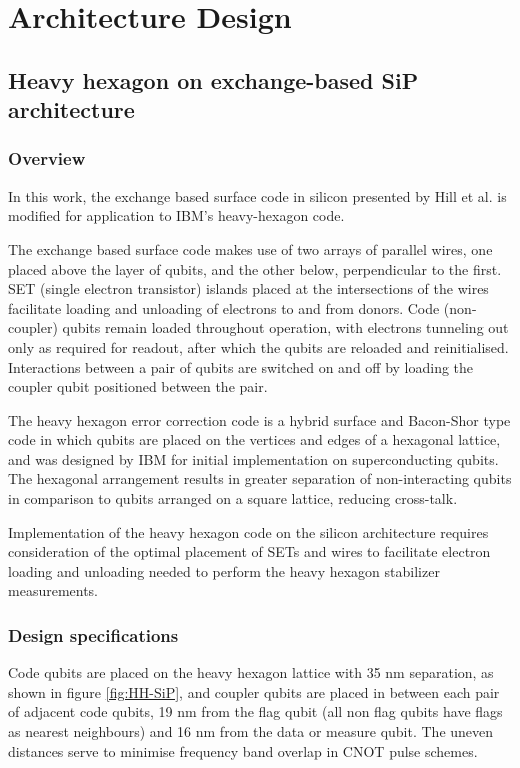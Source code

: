 \documentclass[../Thesis.tex]{subfiles}
\begin{document}
\chapter{Architecture Design}






\section{Heavy hexagon on exchange-based SiP architecture}
\subsection{Overview}
In this work, the exchange based surface code in silicon presented by Hill et al.\cite{surface-exchange}  is modified for application to IBM's heavy-hexagon code\cite{chamberland_topological_2020}. 

The exchange based surface code makes use of two arrays of parallel wires, one placed above the layer of qubits, and the other below, perpendicular to the first. SET (single electron transistor) islands placed at the intersections of the wires facilitate loading and unloading of electrons to and from donors. Code (non-coupler) qubits remain loaded throughout operation, with electrons tunneling out only as required for readout, after which the qubits are reloaded and reinitialised. Interactions between a pair of qubits are switched on and off by loading the coupler qubit positioned between the pair. 

The heavy hexagon error correction code is a hybrid surface and Bacon-Shor type code in which qubits are placed on the vertices and edges of a hexagonal lattice, and was designed by IBM for initial implementation on superconducting qubits. The hexagonal arrangement results in greater separation of non-interacting qubits in comparison to qubits arranged on a square lattice, reducing cross-talk. 

Implementation of the heavy hexagon code on the silicon architecture requires consideration of the optimal placement of SETs and wires to facilitate electron loading and unloading needed to perform the heavy hexagon stabilizer measurements.


\subsection{Design specifications}
Code qubits are placed on the heavy hexagon lattice with 35 nm separation, as shown in figure \ref{fig:HH-SiP}, and coupler qubits are placed in between each pair of adjacent code qubits, 19 nm from the flag qubit (all non flag qubits have flags as nearest neighbours) and 16 nm from the data or measure qubit. The uneven distances serve to minimise frequency band overlap\cite{surface-exchange} in CNOT pulse schemes.
\end{document}
